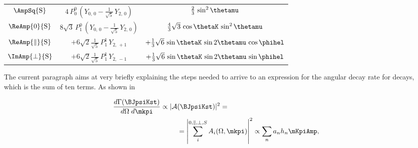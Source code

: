 \begin{table}[!h]
\begin{tabular}{ccc}
    \hline
    $\AmpSq{{\text{S}}}$  &
      $4\, P_0^0\, (Y_{0,\,0} - \tfrac{1}{\sqrt{5}}\, Y_{2,\,0})$  &
      $\tfrac{2}{3}\, \sin^2\thetamu$  \\

    $\ReAmp{0}{{\text{S}}}$  &
      $8\sqrt{3}\, P_1^0\, (Y_{0,\,0} - \tfrac{1}{\sqrt{5}}\, Y_{2,\,0})$  &
      $\tfrac{4}{3}\sqrt{3}\, \cos\thetaK\, \sin^2\thetamu$  \\

    $\ReAmp{\parallel}{{\text{S}}}$  &
      $+6\sqrt{2}\tfrac{1}{\sqrt{5}}\, P_1^1\, Y_{2,\,+1}$  &
      $+\tfrac{1}{3}\sqrt{6}\, \sin\thetaK\, \sin2\thetamu\, \cos\phihel$  \\

    $\ImAmp{\perp}{{\text{S}}}$  &
      $+6\sqrt{2}\tfrac{1}{\sqrt{5}}\, P_1^1\, Y_{2,\,-1}$  &
      $+\tfrac{1}{3}\sqrt{6}\, \sin\thetaK\, \sin2\thetamu\, \sin\phihel$  \\
    \hline
  \end{tabular}
\end{table}

The current paragraph aims at very briefly explaining the steps needed to arrive to an expression for the angular decay rate for \BsJpsiKst decays, which is the sum of ten terms.
As shown in 

\begin{align}
  \frac{d\Gamma(\text{\BJpsiKst})}{d\Omega\;d\mkpi} \propto |\mathcal{A}&(\text{\BJpsiKst})|^2 = \nonumber \\
                                                    &= \left| \sum_i^{0,\parallel,\perp,S} A_i(\Omega,\mkpi) \right|^2  \propto \sum_n a_n h_n \mKpiAmp,
  \label{ang_terms}
\end{align}

